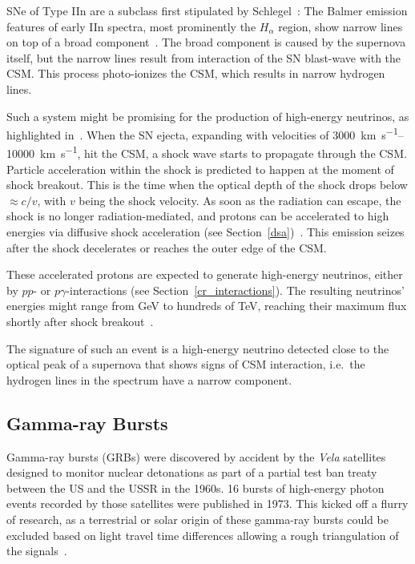 SNe of Type IIn are a subclass first stipulated by Schlegel~: The Balmer emission features of early IIn spectra, most prominently the $H_\alpha$ region, show narrow lines on top of a broad component~. The broad component is caused by the supernova itself, but the narrow lines result from interaction of the SN blast-wave with the CSM. This process photo-ionizes the CSM, which results in narrow hydrogen lines.

Such a system might be promising for the production of high-energy neutrinos, as highlighted in~. When the SN ejecta, expanding with velocities of \SIrange{3000}{10000}{\km\per\s}, hit the CSM, a shock wave starts to propagate through the CSM. Particle acceleration within the shock is predicted to happen at the moment of shock breakout. This is the time when the optical depth of the shock drops below $\approx c/v$, with $v$ being the shock velocity. As soon as the radiation can escape, the shock is no longer radiation-mediated, and protons can be accelerated to high energies via diffusive shock acceleration (see Section~\ref{dsa})~. This emission seizes after the shock decelerates or reaches the outer edge of the CSM.

These accelerated protons are expected to generate high-energy neutrinos, either by $pp$- or $p\gamma$-interactions (see Section~\ref{cr_interactions}). The resulting neutrinos' energies might range from \unit{\giga\eV} to hundreds of \unit{\tera\eV}, reaching their maximum flux shortly after shock breakout~.

The signature of such an event is a high-energy neutrino detected close to the optical peak of a supernova that shows signs of CSM interaction, i.e.\ the hydrogen lines in the spectrum have a narrow component.

\subsection{Gamma-ray Bursts}\label{grb}
Gamma-ray bursts (GRBs) were discovered by accident by the \textit{Vela} satellites designed to monitor nuclear detonations as part of a partial test ban treaty between the US and the USSR in the 1960s. 16 bursts of high-energy photon events recorded by those satellites were published in 1973. This kicked off a flurry of research, as a terrestrial or solar origin of these gamma-ray bursts could be excluded based on light travel time differences allowing a rough triangulation of the signals~.

